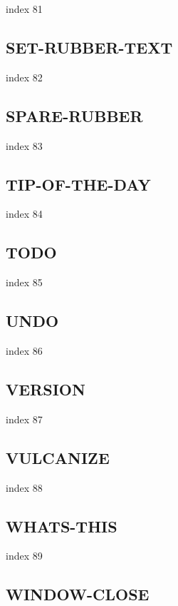 \documentclass[a4paper]{report}
\begin{document}
index 81

\subsection{SET-RUBBER-TEXT}

index 82

\subsection{SPARE-RUBBER}

index 83

\subsection{TIP-OF-THE-DAY}

index 84

\subsection{TODO}

 index 85

\subsection{UNDO}

 index 86

\subsection{VERSION}

index 87

\subsection{VULCANIZE}

index 88

\subsection{WHATS-THIS}

index 89

\subsection{WINDOW-CLOSE}
\end{document}
